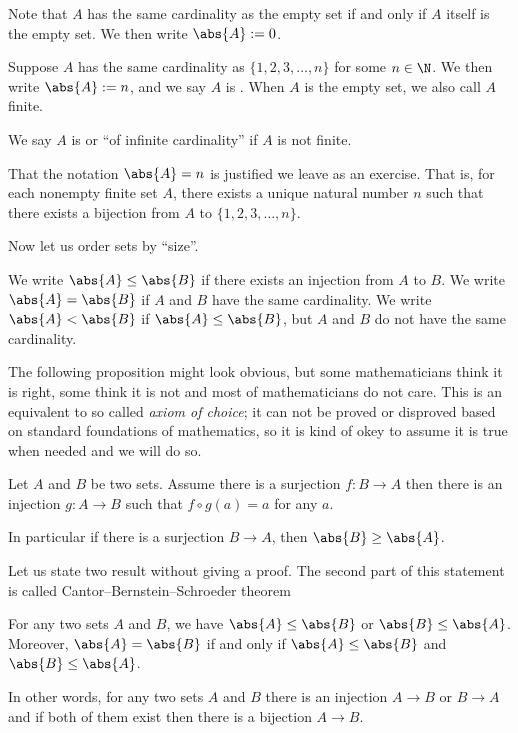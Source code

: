 \documentclass[12pt]{book}
\begin{document}
Note that $A$ has the same cardinality as the empty set if and only
if $A$ itself is the empty set.
We then write $\abs{A} := 0$.

\begin{defn}
Suppose $A$ has the same cardinality as $\{ 1,2,3,\ldots,n \}$
for some $n \in \N$.
We then write $\abs{A} := n$, and we say $A$ is \emph{}.
When $A$ is the empty set, we also call $A$ finite.

We say $A$ is \emph{} or ``of infinite cardinality''
if $A$ is not finite.
\end{defn}

That the notation $\abs{A} = n$ is justified we leave as an exercise.
That
is, for each nonempty finite set $A$, there exists a unique natural number
$n$ such that there exists a bijection from $A$ to $\{ 1,2,3,\ldots,n \}$.

Now let us order sets by ``size''.

\begin{defn}\label{def:comparecards}
We write
$\abs{A} \leq \abs{B}$
if there exists an injection from $A$ to $B$.
We write $\abs{A} = \abs{B}$
if $A$ and $B$ have the same cardinality.
We write $\abs{A} < \abs{B}$
if $\abs{A} \leq \abs{B}$, but $A$ and $B$ do not have the same cardinality.
\end{defn}

The following proposition might look obvious,
but  
some mathematicians think it is right, 
some think it is not and most of mathematicians do not care.
This is an equivalent to so called \emph{axiom of choice};
it can not be proved or disproved based on standard foundations of mathematics, so it is kind of okey to assume it is true when needed and we will do so.

\begin{prop}\label{axiom of chice}
Let $A$ and $B$ be two sets.
Assume there is a surjection $f\colon B\to A$ then there is an injection $g\colon A\to B$
such that $f\circ g (a)=a$ for any $a$.

In particular if there is a surjection $B\to A$, then $\abs{B}\ge \abs{A}$.
\end{prop}

Let us state two result without giving a proof.
The second part of this statement is called Cantor--Bernstein--Schroeder theorem

\begin{thm}
For any two sets $A$ and $B$, we have 
$\abs{A} \leq \abs{B}$ or
$\abs{B} \leq \abs{A}$.
Moreover,
$\abs{A} = \abs{B}$ if and only if
$\abs{A} \leq \abs{B}$ and
$\abs{B} \leq \abs{A}$.

In other words, for any two sets $A$ and $B$
there is an injection $A\to B$ or $B\to A$
and if both of them exist then there is a bijection $A\to B$. 
\end{thm}
\end{document}

